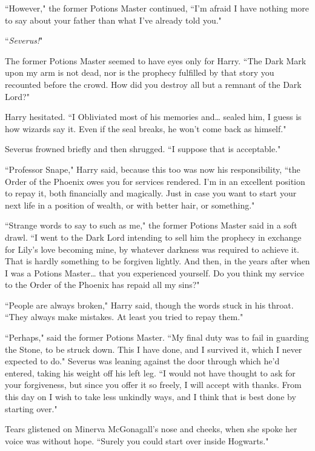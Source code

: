 ``However," the former Potions Master continued, ``I'm afraid I have nothing more to say about your father than what I've already told you."

``\emph{Severus!}"

The former Potions Master seemed to have eyes only for Harry. ``The Dark Mark upon my arm is not dead, nor is the prophecy fulfilled by that story you recounted before the crowd. How did you destroy all but a remnant of the Dark Lord?"

Harry hesitated. ``I Obliviated most of his memories and{\ldots} sealed him, I guess is how wizards say it. Even if the seal breaks, he won't come back as himself."

Severus frowned briefly and then shrugged. ``I suppose that is acceptable."

``Professor Snape," Harry said, because this too was now his responsibility, ``the Order of the Phoenix owes you for services rendered. I'm in an excellent position to repay it, both financially and magically. Just in case you want to start your next life in a position of wealth, or with better hair, or something."

``Strange words to say to such as me," the former Potions Master said in a soft drawl. ``I went to the Dark Lord intending to sell him the prophecy in exchange for Lily's love becoming mine, by whatever darkness was required to achieve it. That is hardly something to be forgiven lightly. And then, in the years after when I was a Potions Master{\ldots} that you experienced yourself. Do you think my service to the Order of the Phoenix has repaid all my sins?"

``People are always broken," Harry said, though the words stuck in his throat. ``They always make mistakes. At least you tried to repay them."

``Perhaps," said the former Potions Master. ``My final duty was to fail in guarding the Stone, to be struck down. This I have done, and I survived it, which I never expected to do." Severus was leaning against the door through which he'd entered, taking his weight off his left leg. ``I would not have thought to ask for your forgiveness, but since you offer it so freely, I will accept with thanks. From this day on I wish to take less unkindly ways, and I think that is best done by starting over."

Tears glistened on Minerva McGonagall's nose and cheeks, when she spoke her voice was without hope. ``Surely you could start over inside Hogwarts."

